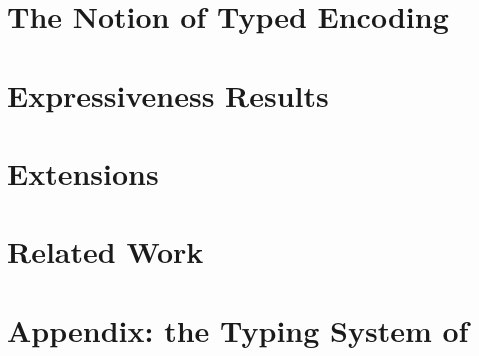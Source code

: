 \documentclass[runningheads]{llncs}
\begin{document}


\section{The Notion of Typed Encoding}
\label{s:expr}


\section{Expressiveness Results}
\label{sec:positive}


\section{Extensions}
\label{sec:extension}




%

\section{Related Work}
\label{sec:relwork}




%

{}


\newpage
\onecolumn
\setcounter{tocdepth}{4}
\tableofcontents

\appendix 
\section{Appendix: the Typing System of \HOp}
\label{app:types}

%
%


\end{document}
